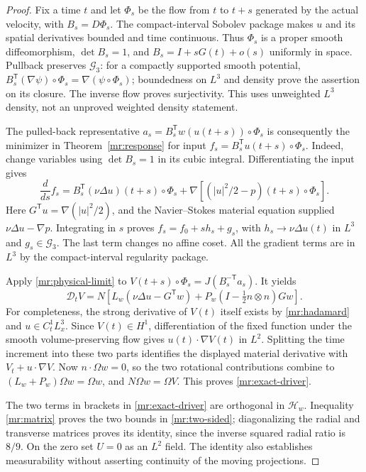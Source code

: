 \begin{proof}
Fix a time $t$ and let $\Phi_s$ be the flow from $t$ to $t+s$ generated
by the actual velocity, with $B_s=D\Phi_s$. The compact-interval Sobolev
package makes $u$ and its spatial derivatives bounded and time continuous.
Thus $\Phi_s$ is a proper smooth diffeomorphism, $\det B_s=1$, and
$B_s=I+sG(t)+o(s)$ uniformly in space. Pullback preserves $\mathcal G_3$:
for a compactly supported smooth potential,
$B_s^{\mathsf T}(\nabla\psi)\circ\Phi_s=\nabla(\psi\circ\Phi_s)$;
boundedness on $L^3$ and density prove the assertion on its closure.
The inverse flow proves surjectivity. This uses unweighted $L^3$ density,
not an unproved weighted density statement.

The pulled-back representative
$a_s=B_s^{\mathsf T}w(u(t+s))\circ\Phi_s$ is consequently the
minimizer in Theorem~\ref{mr:response} for input
$f_s=B_s^{\mathsf T}u(t+s)\circ\Phi_s$. Indeed, change variables using
$\det B_s=1$ in its cubic integral. Differentiating the input gives
\[
 \frac d{ds}f_s
   =B_s^{\mathsf T}(\nu\Delta u)(t+s)\circ\Phi_s
       +\nabla\left[(|u|^2/2-p)(t+s)\circ\Phi_s\right].
\]
Here $G^{\mathsf T}u=\nabla(|u|^2/2)$, and the Navier--Stokes
material equation supplied $\nu\Delta u-\nabla p$.
Integrating in $s$ proves $f_s=f_0+s h_s+g_s$, with
$h_s\to\nu\Delta u(t)$ in $L^3$ and $g_s\in\mathcal G_3$.
The last term changes no affine coset. All the gradient terms are in
$L^3$ by the compact-interval regularity package.

Apply \eqref{mr:physical-limit} to
$V(t+s)\circ\Phi_s=J(B_s^{-\mathsf T}a_s)$. It yields
\[
 \mathcal D_tV
   =N\left[L_w(\nu\Delta u-G^{\mathsf T}w)
                  +P_w(I-\tfrac12n\otimes n)Gw\right].
\]
For completeness, the strong derivative of $V(t)$ itself exists by
\eqref{mr:hadamard} and $u\in C^1_tL^3_x$.
Since $V(t)\in H^1$, differentiation of the fixed function under the
smooth volume-preserving flow gives $u(t)\cdot\nabla V(t)$ in $L^2$.
Splitting the time increment into these two parts identifies the displayed
material derivative with $V_t+u\cdot\nabla V$.
Now $n\cdot\Omega w=0$, so the two rotational contributions combine to
$(L_w+P_w)\Omega w=\Omega w$, and $N\Omega w=\Omega V$.
This proves \eqref{mr:exact-driver}.

The two terms in brackets in \eqref{mr:exact-driver} are orthogonal in
$\mathcal H_w$. Inequality \eqref{mr:matrix} proves the two bounds in
\eqref{mr:two-sided}; diagonalizing the radial and transverse matrices
proves its identity, since the inverse squared radial ratio is $8/9$.
On the zero set $U=0$ as an $L^2$ field. The identity also establishes
measurability without asserting continuity of the moving projections.


\end{proof}
